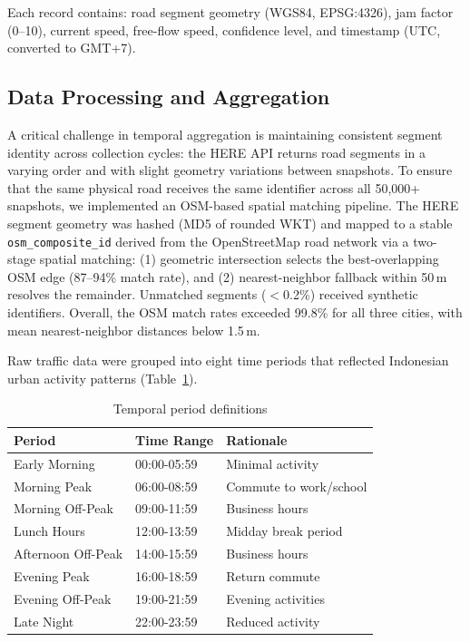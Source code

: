 \documentclass[review,authoryear]{elsarticle}
\begin{document}
Each record contains: road segment geometry (WGS84, EPSG:4326), jam factor (0--10), current speed, free-flow speed, confidence level, and timestamp (UTC, converted to GMT+7).

\subsection{Data Processing and Aggregation}

A critical challenge in temporal aggregation is maintaining consistent segment identity across collection cycles: the HERE API returns road segments in a varying order and with slight geometry variations between snapshots. To ensure that the same physical road receives the same identifier across all 50,000+ snapshots, we implemented an OSM-based spatial matching pipeline. The HERE segment geometry was hashed (MD5 of rounded WKT) and mapped to a stable \texttt{osm\_composite\_id} derived from the OpenStreetMap road network via a two-stage spatial matching: (1) geometric intersection selects the best-overlapping OSM edge (87--94\% match rate), and (2) nearest-neighbor fallback within 50\,m resolves the remainder. Unmatched segments ($<$0.2\%) received synthetic identifiers. Overall, the OSM match rates exceeded 99.8\% for all three cities, with mean nearest-neighbor distances below 1.5\,m.

Raw traffic data were grouped into eight time periods that reflected Indonesian urban activity patterns (Table~\ref{tab:table3_temporal}).

\begin{longtable}[]{@{}lll@{}}
\caption{Temporal period definitions}\label{tab:table3_temporal}\\
\toprule\noalign{}
Period & Time Range & Rationale \\
\midrule\noalign{}
\endhead
\bottomrule\noalign{}
\endlastfoot
Early Morning & 00:00-05:59 & Minimal activity \\
Morning Peak & 06:00-08:59 & Commute to work/school \\
Morning Off-Peak & 09:00-11:59 & Business hours \\
Lunch Hours & 12:00-13:59 & Midday break period \\
Afternoon Off-Peak & 14:00-15:59 & Business hours \\
Evening Peak & 16:00-18:59 & Return commute \\
Evening Off-Peak & 19:00-21:59 & Evening activities \\
Late Night & 22:00-23:59 & Reduced activity \\
\end{longtable}
\end{document}
